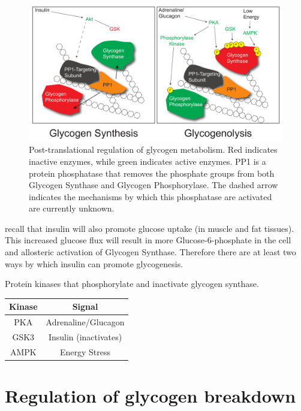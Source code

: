 \documentclass{tufte-handout}
\begin{document}
\begin{figure}
\includegraphics{figures/glycogen-phosphorylation}
\caption{Post-translational regulation of glycogen metabolism.  Red indicates inactive enzymes, while green indicates active enzymes. PP1 is a protein phosphatase that removes the phosphate groups from both Glycogen Synthase and Glycogen Phosphorylase.  The dashed arrow indicates the mechanisms by which this phosphatase are activated are currently unknown.}
\label{fig:glycogen-phosphorylation}
\end{figure}
\vspace{-4em}

 recall that insulin will also promote glucose uptake (in muscle and fat tissues).  This increased glucose flux will result in more Glucose-6-phosphate in the cell and allosteric activation of Glycogen Synthase.  Therefore there are at least two ways by which insulin can promote glycogenesis.

\begin{margintable}
\centering
\caption{Protein kinases that phosphorylate and inactivate glycogen synthase.}
\label{tab:gs-sites}
\begin{tabular}{cc}
\hline
\textbf {Kinase} & \textbf{Signal}  \\
\hline
PKA & Adrenaline/Glucagon \\
GSK3 & Insulin (inactivates) \\
AMPK & Energy Stress \\
\hline
\end{tabular}
\end{margintable}

\section{Regulation of glycogen breakdown}
\end{document}

